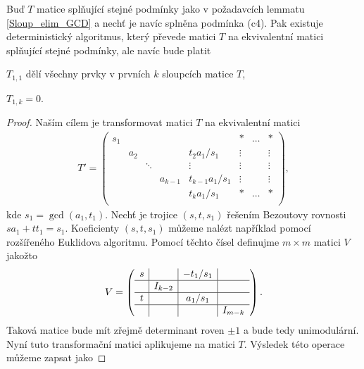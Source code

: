 \begin{lem} \label{Sloup_elim_SNF}
Buď $ T $ matice splňující stejné podmínky jako v požadavcích lemmatu \ref{Sloup_elim_GCD}
a nechť je navíc splněna podmínka (c4). Pak existuje deterministický
algoritmus, který převede matici $ T $ na ekvivalentní matici splňující stejné
podmínky, ale navíc bude platit
\begin{Cond}[resume=Sloup_elim_CONDS]
    \item $ T_{1,1} $ dělí všechny prvky v prvních $ k $ sloupcích matice $ T $,
    \item $ T_{1,k} = 0 $.
\end{Cond}
\end{lem}
\begin{proof}
Naším cílem je transformovat matici $ T $ na ekvivalentní matici
\begin{align*}
T' =
    \left(
    \begin{array}{ccccc|ccc}
        s_1 &     &        &         &                 & \ast   & \hdots & \ast   \\
            & a_2 &        &         & t_2 a_1/s_1     & \vdots &        & \vdots \\
            &     & \ddots &         & \vdots          & \vdots &        & \vdots \\
            &     &        & a_{k-1} & t_{k-1} a_1/s_1 & \vdots &        & \vdots \\
            &     &        &         & t_k a_1/s_1     & \ast   & \hdots & \ast \\
    \end{array}
    \right),
\end{align*}
kde $ s_1 = \gcd(a_1, t_1) $. Nechť je trojice $ (s, t, s_1) $ řešením Bezoutovy
rovnosti $ s a_1 + t t_1 = s_1 $. Koeficienty $ (s, t, s_1) $ můžeme nalézt
například pomocí rozšířeného Euklidova algoritmu.
Pomocí těchto čísel definujme $ m \times m $ matici $ V $ jakožto
\begin{align*}
V =
    \left(
    \begin{array}{c|c|c|c}
      s      &         & - t_1 / s_1 &         \\ \hline
             & I_{k-2} &             &         \\ \hline
      t      &         & a_1 / s_1   &         \\ \hline
             &         &             & I_{m-k} \\
    \end{array}
    \right)
.
\end{align*}
Taková matice bude mít zřejmě determinant roven $ \pm 1 $ a bude tedy
unimodulární. Nyní tuto transformační matici aplikujeme na matici $ T $.
Výsledek této operace můžeme zapsat jako


\end{proof}
